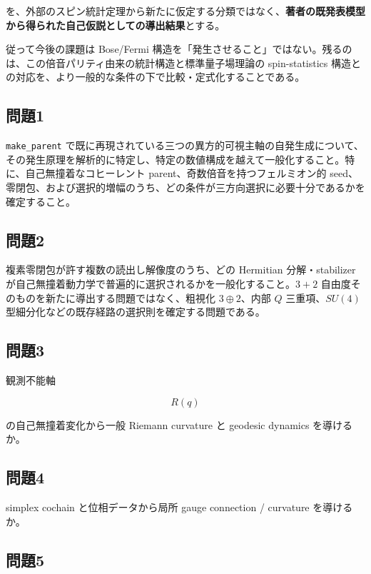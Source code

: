 \documentclass[
  a4paper,
]{ltjsarticle}
\begin{document}
を、外部のスピン統計定理から新たに仮定する分類ではなく、\textbf{著者の既発表模型から得られた自己仮説としての導出結果}とする。

従って今後の課題は Bose/Fermi
構造を「発生させること」ではない。残るのは、この倍音パリティ由来の統計構造と標準量子場理論の
spin-statistics
構造との対応を、より一般的な条件の下で比較・定式化することである。

\subsection{問題1}\label{ux554fux984c1}

\texttt{make\_parent}
で既に再現されている三つの異方的可視主軸の自発生成について、その発生原理を解析的に特定し、特定の数値構成を越えて一般化すること。特に、自己無撞着なコヒーレント
parent、奇数倍音を持つフェルミオン的
seed、零閉包、および選択的増幅のうち、どの条件が三方向選択に必要十分であるかを確定すること。

\subsection{問題2}\label{ux554fux984c2}

複素零閉包が許す複数の読出し解像度のうち、どの Hermitian
分解・stabilizer
が自己無撞着動力学で普遍的に選択されるかを一般化すること。\(3+2\)
自由度そのものを新たに導出する問題ではなく、粗視化 \(3\oplus2\)、内部
\(Q\) 三重項、\(SU(4)\)
型細分化などの既存経路の選択則を確定する問題である。

\subsection{問題3}\label{ux554fux984c3}

観測不能軸

\[
R(q)
\]

の自己無撞着変化から一般 Riemann curvature と geodesic dynamics
を導けるか。

\subsection{問題4}\label{ux554fux984c4}

simplex cochain と位相データから局所 gauge connection / curvature
を導けるか。

\subsection{問題5}\label{ux554fux984c5}
\end{document}
